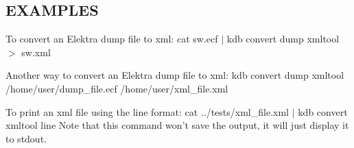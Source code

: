 \subsection*{E\+X\+A\+M\+P\+L\+E\+S}

To convert an Elektra dump file to xml\+: {\ttfamily cat sw.\+ecf $\vert$ kdb convert dump xmltool $>$ sw.\+xml}

Another way to convert an Elektra dump file to xml\+: {\ttfamily kdb convert dump xmltool /home/user/dump\+\_\+file.ecf /home/user/xml\+\_\+file.xml}

To print an xml file using the {\ttfamily line} format\+: {\ttfamily cat ../tests/xml\+\_\+file.xml $\vert$ kdb convert xmltool line} Note that this command won't save the output, it will just display it to {\ttfamily stdout}. 